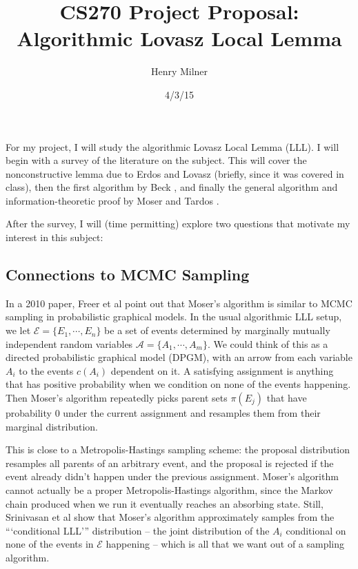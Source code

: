 \documentclass{article}
\author{Henry Milner}
\title{CS270 Project Proposal: Algorithmic Lovasz Local Lemma}
\date{4/3/15}
\begin{document}
\maketitle

For my project, I will study the algorithmic Lovasz Local Lemma (LLL).  I will begin with a survey of the literature on the subject.  This will cover the nonconstructive lemma due to Erdos and Lovasz \cite{erdos1975problems} (briefly, since it was covered in class), then the first algorithm by Beck \cite{beck1991algorithmic}, and finally the general algorithm and information-theoretic proof by Moser and Tardos \cite{moser2010constructive}.

After the survey, I will (time permitting) explore two questions that motivate my interest in this subject:

\subsection{Connections to MCMC Sampling}
In a 2010 paper, Freer et al \cite{freer2010probabilistic} point out that Moser's algorithm is similar to MCMC sampling in probabilistic graphical models.  In the usual algorithmic LLL setup, we let $\mathcal{E} = \{E_1, \cdots, E_n\}$ be a set of events determined by marginally mutually independent random variables $\mathcal{A} = \{A_1, \cdots, A_m\}$.  We could think of this as a directed probabilistic graphical model (DPGM), with an arrow from each variable $A_i$ to the events $c(A_i)$ dependent on it.  A satisfying assignment is anything that has positive probability when we condition on none of the events happening.  Then Moser's algorithm repeatedly picks parent sets $\pi(E_j)$ that have probability $0$ under the current assignment and resamples them from their marginal distribution.

This is close to a Metropolis-Hastings sampling scheme: the proposal distribution resamples all parents of an arbitrary event, and the proposal is rejected if the event already didn't happen under the previous assignment.  Moser's algorithm cannot actually be a proper Metropolis-Hastings algorithm, since the Markov chain produced when we run it eventually reaches an absorbing state.  Still, Srinivasan et al \cite{haeupler2011new} show that Moser's algorithm approximately samples from the ```conditional LLL''' distribution -- the joint distribution of the $A_i$ conditional on none of the events in $\mathcal{E}$ happening -- which is all that we want out of a sampling algorithm.
\end{document}
